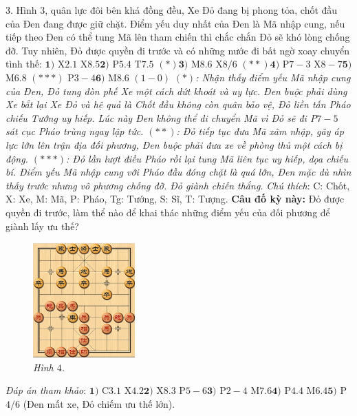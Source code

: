 \begin{multicols}{2}
\begin{figure}[H]
	\end{figure}
	$3.$ Hình $3$, quân lực đôi bên khá đồng đều, Xe Đỏ đang bị phong tỏa, chốt đầu của Đen đang được giữ chặt. Điểm yếu duy nhất của Đen là Mã nhập cung, nếu tiếp theo Đen có thể tung Mã lên tham chiến thì chắc chắn Đỏ sẽ khó lòng chống đỡ. Tuy nhiên, Đỏ được quyền đi trước và có những nước đi bất ngờ xoay chuyển tình thế:
	\vskip 0.1cm
	$\pmb{1)}$	X$2.1$ X$8.5$\quad  $\pmb{2)}$ P$5.4$ T$7.5$ $(*)$\quad $\pmb{3)}$ M$8.6$ X$8/6$ $(**)$\quad $\pmb{4)}$ P$7-3$ X$8-7$\quad $\pmb{5)}$ M$6.8$ $(***)$ P$3-4$\quad $\pmb{6)}$ M$8.6$ $(1-0)$
	\vskip 0.1cm
	\textit{$(*)$: Nhận thấy điểm yếu Mã nhập cung của Đen, Đỏ tung đòn phế Xe một cách dứt khoát và uy lực. Đen buộc phải dùng Xe bắt lại Xe Đỏ và hệ quả là Chốt đầu không còn quân bảo vệ, Đỏ liền tấn Pháo chiếu Tướng uy hiếp. Lúc này Đen không thể di chuyển Mã vì Đỏ sẽ đi P$7-5$ sát cục Pháo trùng ngay lập tức.
	\vskip 0.1cm
	$(**)$: Đỏ tiếp tục đưa Mã xâm nhập, gây áp lực lớn lên trận địa đối phương, Đen buộc phải đưa xe về phòng thủ một cách bị động.
	\vskip 0.1cm
	$(***)$: Đỏ lần lượt điều Pháo rồi lại tung Mã liên tục uy hiếp, dọa chiếu bí. Điểm yếu Mã nhập cung với Pháo đầu đóng chặt là quá lớn, Đen mặc dù nhìn thấy trước nhưng vô phương chống đỡ. Đỏ giành chiến thắng.}
	\vskip 0.1cm
	\textit{Chú thích}: C: Chốt, X: Xe, M: Mã, P: Pháo, Tg: Tướng, S: Sĩ, T: Tượng. 
	\vskip 0.1cm
	\textbf{\color{gocco}Câu đố kỳ này:} Đỏ được quyền đi trước, làm thể nào để khai thác những điểm yếu của đối phương để giành lấy ưu thế?
	\begin{figure}[H]
		\vspace*{-5pt}
		\centering
		\captionsetup{labelformat= empty, justification=centering}
		\includegraphics[width= 0.35\textwidth]{4}
		\caption{\small\textit{\color{gocco}Hình $4$.}}
		\vspace*{-10pt}
	\end{figure}
	\textit{Đáp án tham khảo}: $\pmb{1)}$ C$3.1$ X$4.2$\quad  $\pmb{2)}$ X$8.3$ P$5-6$\quad  $\pmb{3)}$ P$2-4$ M$7.6$\quad $\pmb{4)}$ P$4.4$ M$6.4$\quad $\pmb{5)}$ P$4/6$ (Đen mất xe, Đỏ chiếm ưu thế lớn).

\end{multicols}
